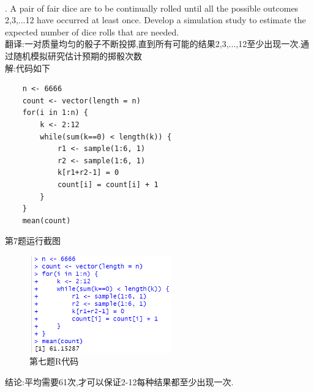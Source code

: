 \documentclass{book}
\begin{document}
\hspace*{\fill} \\

. A pair of fair dice are to be continually rolled until all the possible outcomes 2,3,...12
have occurred at least once. Develop a simulation study to estimate the expected number of dice rolls
that are needed. \\
\noindent
翻译:一对质量均匀的骰子不断投掷,直到所有可能的结果2,3,...,12至少出现一次.通过随机模拟研究估计预期的掷骰次数 \\
解:代码如下
\lstset{language = R}
\begin{lstlisting}
    n <- 6666
    count <- vector(length = n)
    for(i in 1:n) {
        k <- 2:12
        while(sum(k==0) < length(k)) {
            r1 <- sample(1:6, 1)
            r2 <- sample(1:6, 1)
            k[r1+r2-1] = 0
            count[i] = count[i] + 1
        }
    }
    mean(count) 
\end{lstlisting}
第7题运行截图
\begin{figure}[H]
  \centering
  \includegraphics*[height = 4.2cm, width = 6.2cm]{gramFile/第七题运行截图.PNG}
  \caption{第七题R代码}
\end{figure}
\noindent
结论:平均需要61次,才可以保证2-12每种结果都至少出现一次.

\hspace*{\fill} \\
\end{document}
